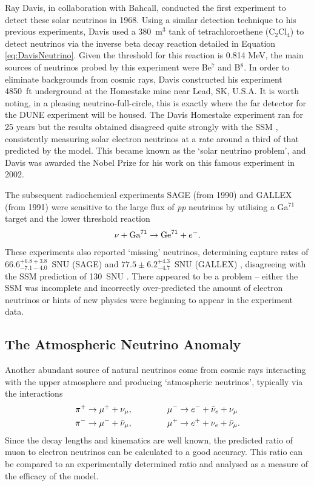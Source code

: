 Ray Davis, in collaboration with Bahcall, conducted the first experiment to detect these solar neutrinos in 1968.  Using a similar detection technique to his previous experiments, Davis used a 380~m$^3$ tank of tetrachloroethene (C$_2$Cl$_4$) to detect neutrinos via the inverse beta decay reaction detailed in Equation \ref{eq:DavisNeutrino}.  Given the threshold for this reaction is 0.814 MeV, the main sources of neutrinos probed by this experiment were Be$^7$ and B$^8$.  In order to eliminate backgrounds from cosmic rays, Davis constructed his experiment 4850~ft underground at the Homestake mine near Lead, SK, U.S.A.  It is worth noting, in a pleasing neutrino-full-circle, this is exactly where the far detector for the DUNE experiment will be housed.  The Davis Homestake experiment ran for 25 years but the results obtained \cite{Cleveland1995} disagreed quite strongly with the SSM \cite{Bahcall1995}, consistently measuring solar electron neutrinos at a rate around a third of that predicted by the model.  This became known as the `solar neutrino problem', and Davis was awarded the Nobel Prize for his work on this famous experiment in 2002.

The subsequent radiochemical experiments SAGE (from 1990) and GALLEX (from 1991) were sensitive to the large flux of \textit{pp} neutrinos by utilising a Ga$^{71}$ target and the lower threshold reaction
\begin{equation}
\nu + \textnormal{Ga}^{71} \rightarrow \textnormal{Ge}^{71} + e^-.
\end{equation}
These experiments also reported `missing' neutrinos, determining capture rates of $66.6^{+6.8+3.8}_{-7.1-4.0}$~SNU (SAGE) \cite{Abdurashitov1994} and $77.5\pm6.2^{+4.3}_{-4.7}$~SNU (GALLEX) \cite{Anselmann1992}, disagreeing with the SSM prediction of 130~SNU \cite{Hampel1999}.  There appeared to be a problem -- either the SSM was incomplete and incorrectly over-predicted the amount of electron neutrinos or hints of new physics were beginning to appear in the experiment data.

\subsection{The Atmospheric Neutrino Anomaly}\label{sec:AtmosphericNeutrinoAnomaly}

Another abundant source of natural neutrinos come from cosmic rays interacting with the upper atmosphere and producing `atmospheric neutrinos', typically via the interactions \cite{Gaisser1990}
\begin{align}
  \pi^+ \rightarrow \mu^+ + \nu_{\mu}, &\hspace{1.5cm} \mu^- \rightarrow e^- + \bar{\nu}_e + \nu_{\mu} \\
  \pi^- \rightarrow \mu^- + \bar{\nu}_{\mu}, &\hspace{1.5cm} \mu^+ \rightarrow e^+ + \nu_e + \bar{\nu}_{\mu}.
\end{align}
Since the decay lengths and kinematics are well known, the predicted ratio of muon to electron neutrinos can be calculated to a good accuracy.  This ratio can be compared to an experimentally determined ratio and analysed as a measure of the efficacy of the model.

